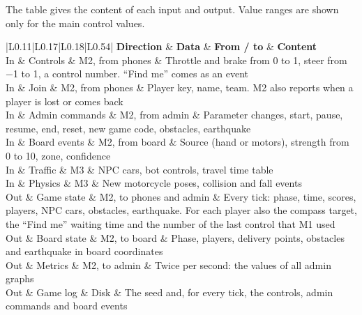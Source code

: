 \documentclass[
  english,
  10pt,
  a4paper,
]{article}
\newcommand{\ckkeep}[1]{\par\noindent\begin{minipage}{\linewidth}\setlength{\parskip}{4pt}#1\end{minipage}\par\smallskip}
\begin{document}
\ckkeep{%
The table gives the content of each input and output. Value ranges are shown only for the main
control values.

\begin{tabular}{|L{0.11}|L{0.17}|L{0.18}|L{0.54}|}
\hline \textbf{Direction} & \textbf{Data} & \textbf{From / to} & \textbf{Content} \\ \hline 
In & Controls & M2, from phones & Throttle and brake from 0 to 1, steer from −1 to 1, a control number. ``Find me'' comes as an event \\ \hline
In & Join & M2, from phones & Player key, name, team. M2 also reports when a player is lost or comes back \\ \hline
In & Admin commands & M2, from admin & Parameter changes, start, pause, resume, end, reset, new game code, obstacles, earthquake \\ \hline
In & Board events & M2, from board & Source (hand or motors), strength from 0 to 10, zone, confidence \\ \hline
In & Traffic & M3 & NPC cars, bot controls, travel time table \\ \hline
In & Physics & M3 & New motorcycle poses, collision and fall events \\ \hline
Out & Game state & M2, to phones and admin & Every tick: phase, time, scores, players, NPC cars, obstacles, earthquake. For each player also the compass target, the ``Find me'' waiting time and the number of the last control that M1 used \\ \hline
Out & Board state & M2, to board & Phase, players, delivery points, obstacles and earthquake in board coordinates \\ \hline
Out & Metrics & M2, to admin & Twice per second: the values of all admin graphs \\ \hline
Out & Game log & Disk & The seed and, for every tick, the controls, admin commands and board events \\ \hline
\end{tabular}}

\end{document}
